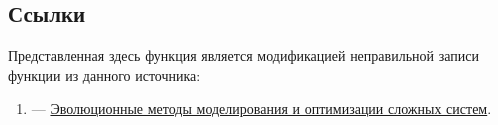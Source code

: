 \subsection {Ссылки}

Представленная здесь функция является модификацией неправильной записи функции из данного источника:

\begin{enumerate}
\item \cite[стр. 29]{book:Semenkin2007} ---  \href{http://files.lib.sfu-kras.ru/ebibl/umkd/22/u_lectures.pdf}{Эволюционные методы моделирования и оптимизации сложных систем}.
\end{enumerate}